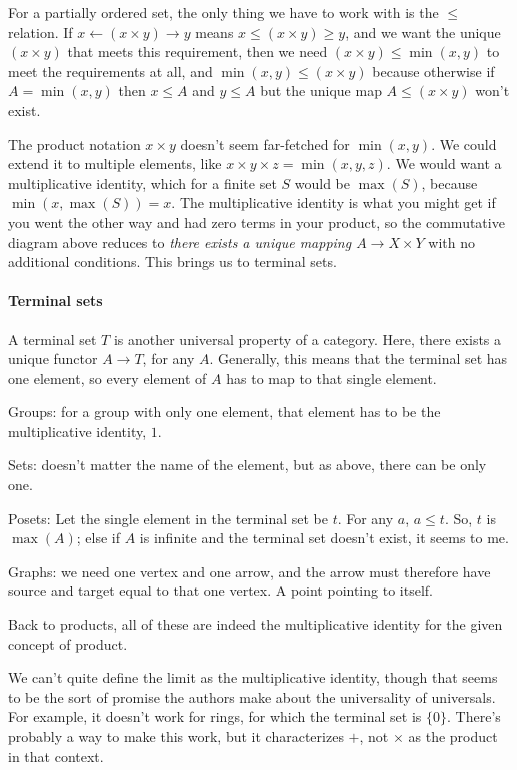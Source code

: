 \documentclass[11pt]{article}
\begin{document}
For a partially ordered set, the only thing we have to work with is the $\leq$ relation.
If $x\leftarrow (x\times y) \rightarrow y$ means $x\leq (x\times y) \geq y$, and we want
the unique $(x\times y)$ that meets this requirement, then we need
$(x\times y)\leq \min(x,y)$ to meet the requirements at all, and 
$\min(x,y)\leq (x\times y)$ because otherwise if $A = \min(x,y)$ then $x\leq A$ and $y\leq
A$ but the unique map $A\leq (x\times y)$ won't exist.

The product notation $x\times y$ doesn't seem far-fetched for $\min(x,y)$. We could extend
it to multiple elements, like $x\times y\times z = \min(x,y,z)$. We would want a
multiplicative identity, which for a finite set $S$ would be $\max(S)$, because
$\min(x,\max(S)) = x$. The multiplicative identity is what you might get if you
went the other way and had zero terms in your product, so the commutative diagram above
reduces to {\em there exists a unique mapping $A\to X\times Y$} with no additional
conditions. This brings us to terminal sets.

\paragraph{Terminal sets} A terminal set $T$ is another universal property of a
category. Here, there exists a unique functor $A\to T$, for any $A$. Generally, this
means that the terminal set has one element, so every element of $A$ has to map to
that single element.

Groups: for a group with only one element, that element has to be the multiplicative identity, $1$.

Sets: doesn't matter the name of the element, but as above, there can be only one.

Posets: Let the single element in the terminal set be $t$. For any $a$, $a\leq t$. So, $t$
is $\max(A)$; else if $A$ is infinite and the terminal set doesn't exist, it seems to me.

Graphs: we need one vertex and one arrow, and the arrow must therefore have source and
target equal to that one vertex. A point pointing to itself.

Back to products, all of these are indeed the multiplicative identity for the given
concept of product.

We can't quite define the limit as the multiplicative identity, though that seems to be
the sort of  promise the authors make about the universality of universals. For example,
it doesn't work for rings, for which the terminal set is $\{0\}$. There's probably a way
to make this work, but it characterizes $+$, not $\times$ as the product in that context.
\end{document}
